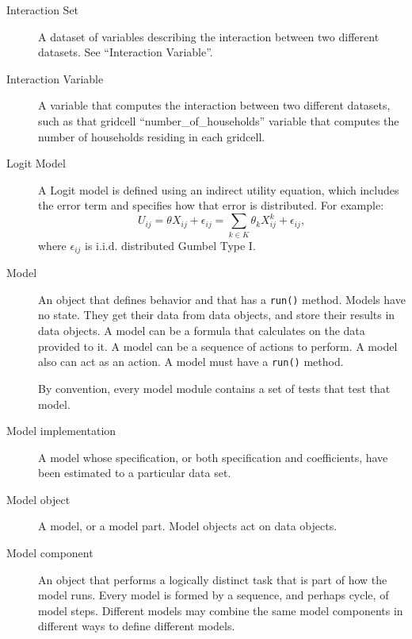 \begin{description}
\item[Interaction Set] 
A dataset of variables describing the interaction between two
different datasets.  See ``Interaction Variable''.

\item[Interaction Variable] 
A variable that computes the interaction between two different
datasets, such as that gridcell ``number_of_households'' 
variable that computes the number of households residing in
each gridcell.

\item[Logit Model]  
A Logit model is defined using an indirect utility equation, which
includes the error term and specifies how that error is
distributed. For example:
\begin{equation}
    U_{ij}={\theta}{X}_{ij}+\epsilon_{ij}
    =\sum_{k \in K}{\theta}_{k}X^{k}_{ij}+\epsilon_{ij},
\end{equation}
\indent where $\epsilon_{ij}$ is i.i.d. distributed Gumbel Type I.

\item[Model] 
An object that defines behavior and that has a \verb|run()|
method.  Models have no state. They get their data from data
objects, and store their results in data objects.  A model can be
a formula that calculates on the data provided to it. A model can
be a sequence of actions to perform.  A model also can act as an
action.  A model must have a \verb|run()| method.

By convention, every model
module contains a set of tests that test that model.

\item[Model implementation] 
A model whose specification, or both specification and
coefficients, have been estimated to a particular data set.

\item[Model object] 
A model, or a model part.  Model objects act on data objects.

\item[Model component] 
An object that performs a logically distinct task that is part of
how the model runs.  Every model is formed by a sequence, and
perhaps cycle, of model steps.  Different models may 
combine the same model components in different ways to define
different models.


\end{description}
